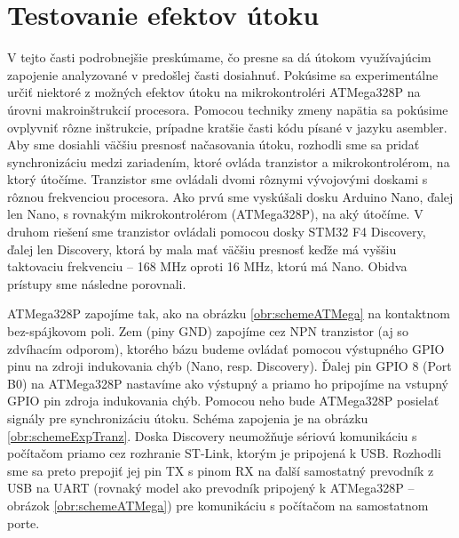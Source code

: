 \section{Testovanie efektov útoku} \label{kap3:sek:testovanieEfektov}
V tejto časti podrobnejšie preskúmame, čo presne sa dá útokom využívajúcim zapojenie analyzované v predošlej časti dosiahnuť. Pokúsime sa experimentálne určiť niektoré z možných efektov útoku na mikrokontroléri ATMega328P na úrovni makroinštrukcií procesora. Pomocou techniky zmeny napätia sa pokúsime ovplyvniť rôzne inštrukcie, prípadne kratšie časti kódu písané v jazyku asembler. Aby sme dosiahli väčšiu presnosť načasovania útoku, rozhodli sme sa pridať synchronizáciu medzi zariadením, ktoré ovláda tranzistor a mikrokontrolérom, na ktorý útočíme. Tranzistor sme ovládali dvomi rôznymi vývojovými doskami s rôznou frekvenciou procesora. Ako prvú sme vyskúšali dosku Arduino Nano, ďalej len Nano, s rovnakým mikrokontrolérom (ATMega328P), na aký útočíme. V druhom riešení sme tranzistor ovládali pomocou dosky STM32 F4 Discovery, ďalej len Discovery, ktorá by mala mať väčšiu presnosť keďže má vyššiu taktovaciu frekvenciu -- 168 MHz oproti 16 MHz, ktorú má Nano. Obidva prístupy sme následne porovnali.

ATMega328P zapojíme tak, ako na obrázku \ref{obr:schemeATMega} na kontaktnom bez-spájkovom poli. Zem (piny GND) zapojíme cez NPN tranzistor (aj so zdvíhacím odporom), ktorého bázu budeme ovládať pomocou výstupného GPIO pinu na zdroji indukovania chýb (Nano, resp. Discovery). Ďalej pin GPIO 8 (Port B0) na ATMega328P nastavíme ako výstupný a priamo ho pripojíme na vstupný GPIO pin zdroja indukovania chýb. Pomocou neho bude ATMega328P posielať signály pre synchronizáciu útoku. Schéma zapojenia je na obrázku \ref{obr:schemeExpTranz}. Doska Discovery neumožňuje sériovú komunikáciu s počítačom priamo cez rozhranie ST-Link, ktorým je pripojená k USB. Rozhodli sme sa preto prepojiť jej pin TX s pinom RX na ďalší samostatný prevodník z USB na UART (rovnaký model ako prevodník pripojený k ATMega328P -- obrázok \ref{obr:schemeATMega}) pre komunikáciu s počítačom na samostatnom porte.

